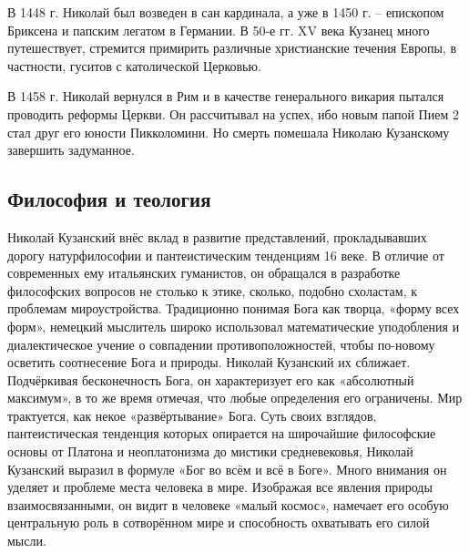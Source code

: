 \documentclass[
]{article}
\begin{document}
В 1448 г. Николай был возведен в сан кардинала, а уже в 1450 г. --
епископом Бриксена и папским легатом в Германии. В 50-е гг. XV века
Кузанец много путешествует, стремится примирить различные христианские
течения Европы, в частности, гуситов с католической Церковью.

В 1458 г. Николай вернулся в Рим и в качестве генерального викария
пытался проводить реформы Церкви. Он рассчитывал на успех, ибо новым
папой Пием 2 стал друг его юности Пикколомини. Но смерть помешала
Николаю Кузанскому завершить задуманное.

\hypertarget{ux444ux438ux43bux43eux441ux43eux444ux438ux44f-ux438-ux442ux435ux43eux43bux43eux433ux438ux44f}{%
\subsection{Философия и
теология}\label{ux444ux438ux43bux43eux441ux43eux444ux438ux44f-ux438-ux442ux435ux43eux43bux43eux433ux438ux44f}}

Николай Кузанский внёс вклад в развитие представлений, прокладывавших
дорогу натурфилософии и пантеистическим тенденциям 16 веке. В отличие от
современных ему итальянских гуманистов, он обращался в разработке
философских вопросов не столько к этике, сколько, подобно схоластам, к
проблемам мироустройства. Традиционно понимая Бога как творца, «форму
всех форм», немецкий мыслитель широко использовал математические
уподобления и диалектическое учение о совпадении противоположностей,
чтобы по-новому осветить соотнесение Бога и природы. Николай Кузанский
их сближает. Подчёркивая бесконечность Бога, он характеризует его как
«абсолютный максимум», в то же время отмечая, что любые определения его
ограничены. Мир трактуется, как некое «развёртывание» Бога. Суть своих
взглядов, пантеистическая тенденция которых опирается на широчайшие
философские основы от Платона и неоплатонизма до мистики средневековья,
Николай Кузанский выразил в формуле «Бог во всём и всё в Боге». Много
внимания он уделяет и проблеме места человека в мире. Изображая все
явления природы взаимосвязанными, он видит в человеке «малый космос»,
намечает его особую центральную роль в сотворённом мире и способность
охватывать его силой мысли.
\end{document}
